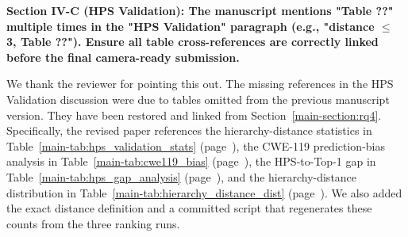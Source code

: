 \documentclass[journal,onecolumn]{IEEEtran}
\begin{document}
\begin{table}[!ht]
\centering
\scriptsize
\setlength{\tabcolsep}{5pt}
\renewcommand{\arraystretch}{1.0}
\caption{Genuine-abstention/invalid-response rates (\% of all responses), pooled over both SVD settings and datasets; T\,=\,0.1 is averaged across two runs.}
\label{tab:response-abst-temp}
\end{table}

\textbf{Section IV-C (HPS Validation): The manuscript mentions "Table ??" multiple times in the "HPS Validation" paragraph (e.g., "distance $\le$ 3, Table ??"). Ensure all table cross-references are correctly linked before the final camera-ready submission.}

We thank the reviewer for pointing this out. The missing references in the HPS Validation discussion were due to tables omitted from the previous manuscript version. They have been restored and linked from Section~\ref{main-section:rq4}. Specifically, the revised paper references the hierarchy-distance statistics in Table~\ref{main-tab:hps_validation_stats} (page~\pageref{main-tab:hps_validation_stats}), the CWE-119 prediction-bias analysis in Table~\ref{main-tab:cwe119_bias} (page~\pageref{main-tab:cwe119_bias}), the HPS-to-Top-1 gap in Table~\ref{main-tab:hps_gap_analysis} (page~\pageref{main-tab:hps_gap_analysis}), and the hierarchy-distance distribution in Table~\ref{main-tab:hierarchy_distance_dist} (page~\pageref{main-tab:hierarchy_distance_dist}). We also added the exact distance definition and a committed script that regenerates these counts from the three ranking runs.
\end{document}
